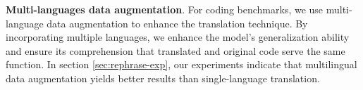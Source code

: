 \textbf{Multi-languages data augmentation}. 
For coding benchmarks, we use multi-language data augmentation to enhance the translation technique. 
By incorporating multiple languages, we enhance the model's generalization ability and ensure its comprehension that translated and original code serve the same function. 
In section \ref{sec:rephrase-exp}, our experiments indicate that multilingual data augmentation yields better results than single-language translation. 












